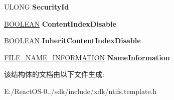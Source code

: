 \begin{DoxyCompactItemize}
U\+L\+O\+NG {\bfseries Security\+Id}
\item 
\mbox{\label{struct___f_i_l_e___o_l_e___a_l_l___i_n_f_o_r_m_a_t_i_o_n_a3caa98d685e2be86cf6e112fac206f9c}} 
\hyperlink{_processor_bind_8h_a112e3146cb38b6ee95e64d85842e380a}{B\+O\+O\+L\+E\+AN} {\bfseries Content\+Index\+Disable}
\item 
\mbox{\label{struct___f_i_l_e___o_l_e___a_l_l___i_n_f_o_r_m_a_t_i_o_n_a9fea1bf183b6c789a837ffb46cacc61d}} 
\hyperlink{_processor_bind_8h_a112e3146cb38b6ee95e64d85842e380a}{B\+O\+O\+L\+E\+AN} {\bfseries Inherit\+Content\+Index\+Disable}
\item 
\mbox{\label{struct___f_i_l_e___o_l_e___a_l_l___i_n_f_o_r_m_a_t_i_o_n_a2411729a7a198abe3ae7c8166a87ebde}} 
\hyperlink{struct___f_i_l_e___n_a_m_e___i_n_f_o_r_m_a_t_i_o_n}{F\+I\+L\+E\+\_\+\+N\+A\+M\+E\+\_\+\+I\+N\+F\+O\+R\+M\+A\+T\+I\+ON} {\bfseries Name\+Information}
\end{DoxyCompactItemize}


该结构体的文档由以下文件生成\+:\begin{DoxyCompactItemize}
\item 
E\+:/\+React\+O\+S-\/0../sdk/include/xdk/ntifs.\+template.\+h\end{DoxyCompactItemize}
